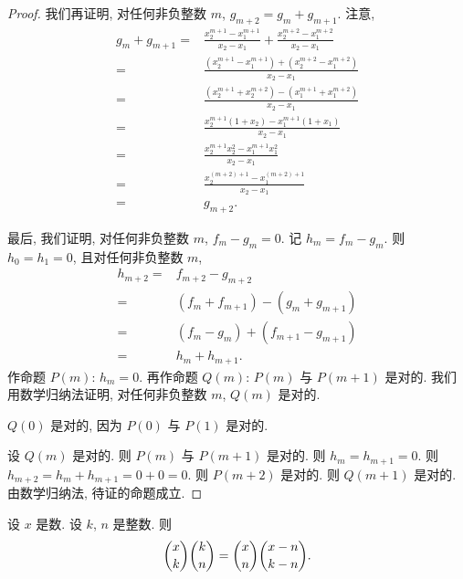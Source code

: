 \documentclass[../libro.tex]{subfiles}
\begin{document}
\begin{proof}
    我们再证明, 对任何非负整数 \(m\),
    \(g_{m+2} = g_m + g_{m+1}\).
    注意,
    \begin{align*}
        g_m + g_{m+1}
        = {} &
        \frac{x_2^{m+1} - x_1^{m+1}}{x_2 - x_1}
        + \frac{x_2^{m+2} - x_1^{m+2}}{x_2 - x_1}
        \\
        = {} &
        \frac{(x_2^{m+1} - x_1^{m+1})
        + (x_2^{m+2} - x_1^{m+2})}{x_2 - x_1}
        \\
        = {} &
        \frac{(x_2^{m+1} + x_2^{m+2})
        - (x_1^{m+1} + x_1^{m+2})}{x_2 - x_1}
        \\
        = {} &
        \frac{x_2^{m+1} (1 + x_2)
        - x_1^{m+1} (1 + x_1)}{x_2 - x_1}
        \\
        = {} &
        \frac{x_2^{m+1} x_2^2 - x_1^{m+1} x_1^2}{x_2 - x_1}
        \\
        = {} &
        \frac{x_2^{(m+2)+1} - x_1^{(m+2)+1}}{x_2 - x_1}
        \\
        = {} &
        g_{m+2}.
    \end{align*}

    最后, 我们证明, 对任何非负整数 \(m\),
    \(f_m - g_m = 0\).
    记 \(h_m = f_m - g_m\).
    则 \(h_0 = h_1 = 0\),
    且对任何非负整数 \(m\),
    \begin{align*}
        h_{m+2}
        = {} &
        f_{m+2} - g_{m+2}
        \\
        = {} &
        (f_m + f_{m+1}) - (g_m + g_{m+1})
        \\
        = {} &
        (f_m - g_m) + (f_{m+1} - g_{m+1})
        \\
        = {} &
        h_m + h_{m+1}.
    \end{align*}
    作命题 \(P(m)\): \(h_m = 0\).
    再作命题 \(Q(m)\): \(P(m)\) 与 \(P(m+1)\) 是对的.
    我们用数学归纳法证明, 对任何非负整数 \(m\), \(Q(m)\) 是对的.

    \(Q(0)\) 是对的, 因为 \(P(0)\) 与 \(P(1)\) 是对的.

    设 \(Q(m)\) 是对的.
    则 \(P(m)\) 与 \(P(m+1)\) 是对的.
    则 \(h_m = h_{m+1} = 0\).
    则
    \(h_{m+2} = h_m + h_{m+1} = 0 + 0 = 0\).
    则 \(P(m+2)\) 是对的.
    则 \(Q(m+1)\) 是对的.
    由数学归纳法, 待证的命题成立.
\end{proof}

\begin{theorem}
    设 \(x\) 是数.
    设 \(k\), \(n\) 是整数.
    则
    \begin{align*}
        \dbinom{x}{k} \dbinom{k}{n}
        = \dbinom{x}{n} \dbinom{x-n}{k-n}.
    \end{align*}
\end{theorem}
\end{document}
